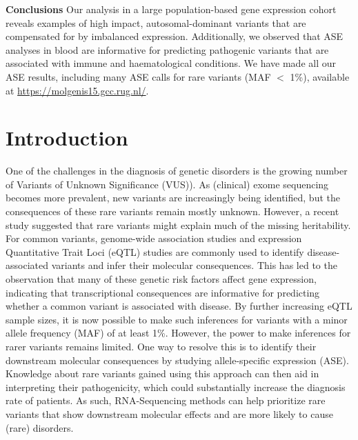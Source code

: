 \textbf{Conclusions} Our analysis in a large population-based gene expression cohort reveals examples of high impact, autosomal-dominant variants that are compensated for by imbalanced expression. Additionally, we observed that ASE analyses in blood are informative for predicting pathogenic variants that  are associated with immune and haematological conditions. We have made all our ASE results, including many ASE calls for rare variants (MAF $<$ 1\%), available at \url{https://molgenis15.gcc.rug.nl/}. 

\section{Introduction}
One of the challenges in the diagnosis of genetic disorders is the growing number of Variants of Unknown Significance (VUS)\cite{hoffman-andrewsKnownUnknownChallenges2018,direstaNextgenerationSequencingApproach2018}). As (clinical) exome sequencing becomes more prevalent, new variants are increasingly being identified, but the consequences of these rare variants remain mostly unknown. However, a recent study suggested that rare variants might explain much of the missing heritability\cite{wainschteinRecoveryTraitHeritability2019}. For common variants, genome-wide association studies and expression Quantitative Trait Loci (eQTL) studies\cite{zhernakovaIdentificationContextdependentExpression2017,aguetGeneticEffectsGene2017,vosaUnravelingPolygenicArchitecture2018} are commonly used to identify disease-associated variants and infer their molecular consequences. This has led to the observation that many of these genetic risk factors affect gene expression, indicating that transcriptional consequences are informative for predicting whether a common variant is associated with disease. By further increasing eQTL sample sizes, it is now possible to make such inferences for variants with a minor allele frequency (MAF) of at least 1\%\cite{vosaUnravelingPolygenicArchitecture2018}. However, the power to make inferences for rarer variants remains limited. One way to resolve this is to identify their downstream molecular consequences by studying allele-specific expression (ASE)\cite{bombaImpactRareLowfrequency2017}. Knowledge about rare variants gained using this approach can then aid in interpreting their pathogenicity, which could substantially increase the diagnosis rate of patients\cite{macarthurGuidelinesInvestigatingCausality2014,kremerGeneticDiagnosisMendelian2017}. As such, RNA-Sequencing methods can help prioritize rare variants that show downstream molecular effects and are more likely to cause (rare) disorders.

